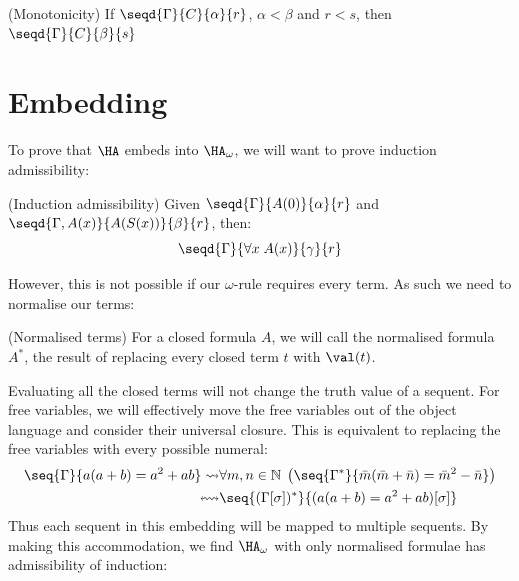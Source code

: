 \begin{cththeorem}{(Monotonicity)}
    If $\seqd{\Gamma}{C}{\alpha}{r}$, $\alpha < \beta$ and $r < s$, then $\seqd{\Gamma}{C}{\beta}{s}$
\end{cththeorem}

\section{Embedding}

To prove that $\HA$ embeds into $\HA_\omega$, we will want to prove induction admissibility:

\begin{cthlemma}{(Induction admissibility)}
    Given $\seqd{\Gamma}{A(0)}{\alpha}{r}$ and $\seqd{\Gamma,A(x)}{A(S(x))}{\beta}{r}$, then:
    \[ \seqd{\Gamma}{\forall x\; A(x)}{\gamma}{r}\]
\end{cthlemma}

However, this is not possible if our $\omega$-rule requires every term. As such we need to normalise our terms:

\begin{cthdefinition}{(Normalised terms)}
    For a closed formula $A$, we will call the normalised formula $A^*$, the result of replacing every closed term $t$ with $\val(t)$.
\end{cthdefinition}
Evaluating all the closed terms will not change the truth value of a sequent. For free variables, we will effectively move the free variables out of the object language and consider their universal closure. This is equivalent to replacing the free variables with every possible numeral:
\begin{align*}
    \seq{\Gamma}{a(a+b)=a^2+ab} \rightsquigarrow &\forall m,n \in \mathbb{N} \; \left( \seq{\Gamma^*}{\bar{m}(\bar{m}+\bar{n})=\bar{m}^2-\bar{n}} \right) \\
    \leftrightsquigarrow &\seq{(\Gamma[\sigma])^*}{(a(a+b)=a^2+ab)[\sigma]}
\end{align*}
Thus each sequent in this embedding will be mapped to multiple sequents. By making this accommodation, we find $\HA_\omega$ with only normalised formulae has admissibility of induction:

